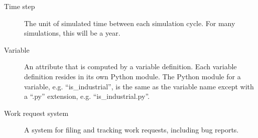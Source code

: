 \begin{description}
\item[Time step] 
The unit of simulated time between each simulation cycle. For many
simulations, this will be a year.

\item[Variable] \variablesindex
An attribute \attributesindex that is computed by a variable \variablesindex definition.  Each
variable \variablesindex definition resides in its own Python \pythonindex module.  The 
Python \pythonindex module for a variable, \variablesindex e.g. ``is_industrial'', is the
same as the variable \variablesindex name except with a ``.py'' extension, 
e.g. ``is_industrial.py''.  

\item[Work request system] 
A system for filing and tracking work requests, including bug
reports.

\end{description}
